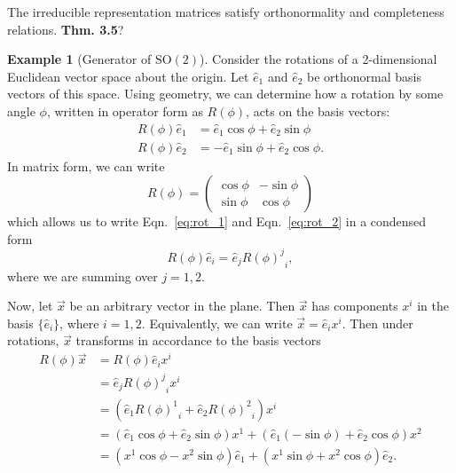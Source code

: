 \documentclass[12pt]{report}
\newcommand{\ehat}{\hat{e}}
\newcommand{\mat}[3]{{{#1}^#2}_#3}
\newcommand{\sotwo}{\textrm{SO}{(2)}}
\theoremstyle{definition}
\newtheorem{example}{Example}[chapter]
\begin{document}
The irreducible representation matrices satisfy orthonormality and completeness relations.\textbf{ Thm. 3.5}?

\begin{example}[Generator of $\sotwo$]
    Consider the rotations of a 2-dimensional Euclidean vector space about the origin. Let $\ehat_1$ and $\ehat_2$ be orthonormal basis vectors of this space. Using geometry, we can determine how a rotation by some angle $\phi$, written in operator form as $R(\phi)$, acts on the basis vectors:
    \begin{align}
        R(\phi)\ehat_1 &= \ehat_1\cos\phi + \ehat_2\sin\phi \label{eq:rot_1}\\
        R(\phi)\ehat_2 &= -\ehat_1\sin\phi + \ehat_2\cos\phi.\label{eq:rot_2}
    \end{align}
    In matrix form, we can write
    \begin{equation}
        R(\phi) = 
        \begin{pmatrix}
            \cos\phi & -\sin\phi \\
            \sin\phi & \cos\phi
        \end{pmatrix}
    \end{equation}
    which allows us to write Eqn.~\ref{eq:rot_1} and Eqn.~\ref{eq:rot_2} in a condensed form
    \begin{equation}
        R(\phi)\ehat_i = \ehat_j{{R(\phi)}^j}_i,
    \end{equation}
    where we are summing over $j=1,2$.

    Now, let $\vec{x}$ be an arbitrary vector in the plane. Then $\vec{x}$ has components $x^i$ in the basis $\{\ehat_i\}$, where $i=1,2$. Equivalently, we can write $\vec{x}=\ehat_i x^i$. Then under rotations, $\vec{x}$ transforms in accordance to the basis vectors
    \begin{align}
        R(\phi)\vec{x} &= R(\phi)\ehat_i x^i \label{eq:rot_vec} \\
        &= \ehat_j{{R(\phi)}^j}_i x^i \nonumber \\
        &= \left( \ehat_1\mat{R(\phi)}{1}{i} + \ehat_2\mat{R(\phi)}{2}{i} \right)x^i \nonumber \\
        &= \left( \ehat_1\cos\phi + \ehat_2\sin\phi \right) x^1 + \left( \ehat_1(-\sin\phi) + \ehat_2\cos\phi \right) x^2 \nonumber \\
        &= \left( x^1\cos\phi - x^2\sin\phi \right)\ehat_1 + \left( x^1\sin\phi + x^2\cos\phi \right)\ehat_2.  \nonumber
    \end{align}


\end{example}
\end{document}
